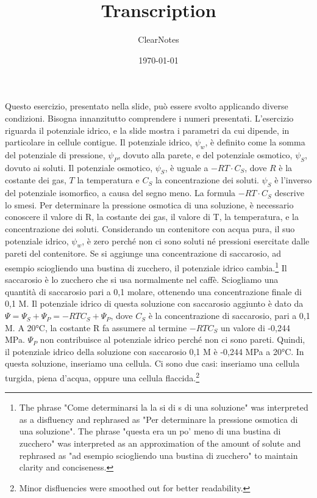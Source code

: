 \documentclass[11pt, a4paper]{article}
\title{Transcription}
\author{ClearNotes}
\date{\today}
\begin{document}
\maketitle
\begin{spacing}{1.15}
Questo esercizio, presentato nella slide, può essere svolto applicando diverse condizioni. Bisogna innanzitutto comprendere i numeri presentati. L'esercizio riguarda il potenziale idrico, e la slide mostra i parametri da cui dipende, in particolare in cellule contigue. Il potenziale idrico, $\psi_w$, è definito come la somma del potenziale di pressione, $\psi_P$, dovuto alla parete, e del potenziale osmotico, $\psi_S$, dovuto ai soluti. Il potenziale osmotico, $\psi_S$, è uguale a $-RT \cdot C_S$, dove $R$ è la costante dei gas, $T$ la temperatura e $C_S$ la concentrazione dei soluti. $\psi_S$ è l'inverso del potenziale isomorfico, a causa del segno meno. La formula $-RT \cdot C_S$ descrive lo smesi.
Per determinare la pressione osmotica di una soluzione, è necessario conoscere il valore di R, la costante dei gas, il valore di T, la temperatura, e la concentrazione dei soluti. Considerando un contenitore con acqua pura, il suo potenziale idrico, $\psi_w$, è zero perché non ci sono soluti né pressioni esercitate dalle pareti del contenitore. Se si aggiunge una concentrazione di saccarosio, ad esempio sciogliendo una bustina di zucchero, il potenziale idrico cambia.\footnote{The phrase "Come determinarsi la la si di s di una soluzione" was interpreted as a disfluency and rephrased as "Per determinare la pressione osmotica di una soluzione". The phrase "questa era un po' meno di una bustina di zucchero" was interpreted as an approximation of the amount of solute and rephrased as "ad esempio sciogliendo una bustina di zucchero" to maintain clarity and conciseness.}
Il saccarosio è lo zucchero che si usa normalmente nel caffè. Sciogliamo una quantità di saccarosio pari a 0,1 molare, ottenendo una concentrazione finale di 0,1 M. Il potenziale idrico di questa soluzione con saccarosio aggiunto è dato da $\Psi = \Psi_S + \Psi_P = -RTC_S + \Psi_P$, dove $C_S$ è la concentrazione di saccarosio, pari a 0,1 M. A 20°C, la costante R fa assumere al termine $-RTC_S$ un valore di -0,244 MPa. $\Psi_P$ non contribuisce al potenziale idrico perché non ci sono pareti. Quindi, il potenziale idrico della soluzione con saccarosio 0,1 M è -0,244 MPa a 20°C. In questa soluzione, inseriamo una cellula. Ci sono due casi: inseriamo una cellula turgida, piena d'acqua, oppure una cellula flaccida.\footnote{Minor disfluencies were smoothed out for better readability.}

\end{spacing}
\end{document}
